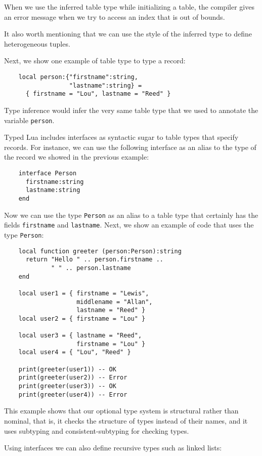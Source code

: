 \documentclass[preprint]{sig-alternate}
\begin{document}
When we use the inferred table type while initializing a table, the
compiler gives an error message when we try to access an index that
is out of bounds.

It also worth mentioning that we can use the style of the inferred
type to define heterogeneous tuples.

Next, we show one example of table type to type a record:
\begin{verbatim}
    local person:{"firstname":string,
                  "lastname":string} =
      { firstname = "Lou", lastname = "Reed" } 
\end{verbatim}

Type inference would infer the very same table type that we used to
annotate the variable \texttt{person}.

Typed Lua includes interfaces as syntactic sugar to table types
that specify records.
For instance, we can use the following interface as an alias to the
type of the record we showed in the previous example:
\begin{verbatim}
    interface Person
      firstname:string
      lastname:string
    end
\end{verbatim}

Now we can use the type \texttt{Person} as an alias to a table type
that certainly has the fields \texttt{firstname} and \texttt{lastname}.
Next, we show an example of code that uses the type \texttt{Person}:
\begin{verbatim}
    local function greeter (person:Person):string
      return "Hello " .. person.firstname ..
             " " .. person.lastname
    end

    local user1 = { firstname = "Lewis",
                    middlename = "Allan",
                    lastname = "Reed" }
    local user2 = { firstname = "Lou" }

    local user3 = { lastname = "Reed",
                    firstname = "Lou" }
    local user4 = { "Lou", "Reed" }

    print(greeter(user1)) -- OK
    print(greeter(user2)) -- Error
    print(greeter(user3)) -- OK
    print(greeter(user4)) -- Error
\end{verbatim}

This example shows that our optional type system is structural rather
than nominal, that is, it checks the structure of types instead of
their names, and it uses subtyping and consistent-subtyping for
checking types.

Using interfaces we can also define recursive types such as linked
lists:
\end{document}
